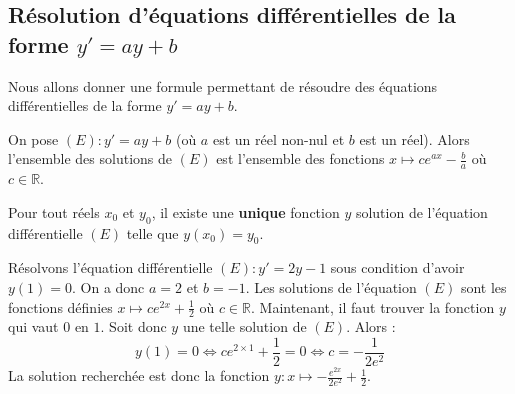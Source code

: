 	\subsection{Résolution d'équations différentielles de la forme \texorpdfstring{$y'=ay+b$}{y'=ay+b}}

	Nous allons donner une formule permettant de résoudre des équations différentielles de la forme $y' = ay+b$.

	\begin{formula}[Formule]
		On pose $(E) : y'=ay+b$ (où $a$ est un réel non-nul et $b$ est un réel). Alors l'ensemble des solutions de $(E)$ est l'ensemble des fonctions $x \mapsto c e^{ax} - \frac{b}{a}$ où $c \in \mathbb{R}$.
	\end{formula}

	\begin{formula}[Théorème]
		Pour tout réels $x_0$ et $y_0$, il existe une \textbf{unique} fonction $y$ solution de l'équation différentielle $(E)$ telle que $y(x_0) = y_0$.
	\end{formula}

	\begin{tip}[Exemple]
		Résolvons l'équation différentielle $(E) : y'=2y-1$ sous condition d'avoir $y(1) = 0$.
		\newpar
		On a donc $a = 2$ et $b = -1$. Les solutions de l'équation $(E)$ sont les fonctions définies $x \mapsto c e^{2x} + \frac{1}{2}$ où $c \in \mathbb{R}$.
		\newpar
		Maintenant, il faut trouver la fonction $y$ qui vaut $0$ en $1$. Soit donc $y$ une telle solution de $(E)$. Alors :
		\[ y(1) =  0 \iff c e^{2 \times 1} + \frac{1}{2} = 0 \iff c = -\frac{1}{2e^2} \]
		La solution recherchée est donc la fonction $y : x \mapsto -\frac{e^{2x}}{2e^2} + \frac{1}{2}$.
	\end{tip}

